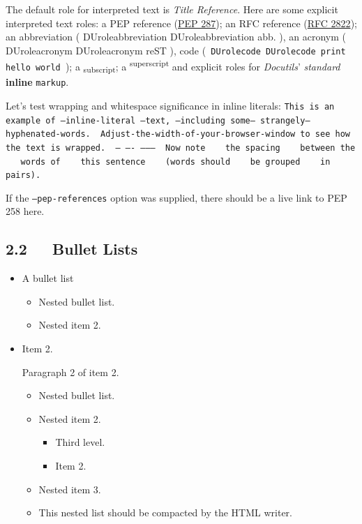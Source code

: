 \documentclass[a4paper]{article}
\providecommand*{\DUrole}[2]{%
  \ifcsname DUrole#1\endcsname%
    \csname DUrole#1\endcsname{#2}%
  \else%
    #2%
  \fi%
}
\providecommand*{\DUroletitlereference}[1]{\textsl{#1}}
\begin{document}
The default role for interpreted text is \DUroletitlereference{Title Reference}.  Here are
some explicit interpreted text roles: a PEP reference (\href{http://www.python.org/dev/peps/pep-0287}{PEP 287}); an
RFC reference (\href{http://tools.ietf.org/html/rfc2822.html}{RFC 2822}); an abbreviation (\DUrole{abbreviation}{abb.}), an acronym
(\DUrole{acronym}{reST}), code (\texttt{\DUrole{code}{print \textquotedbl{}hello world\textquotedbl{}}}); a \textsubscript{subscript};
a \textsuperscript{superscript} and explicit roles for \DUroletitlereference{Docutils}’
\emph{standard} \textbf{inline} \texttt{markup}.


Let’s test wrapping and whitespace significance in inline literals:
\texttt{This is an example of --inline-literal --text, --including some--
strangely--hyphenated-words. ~Adjust-the-width-of-your-browser-window
to see how the text is wrapped. ~-- ---- -------- ~Now note ~ ~the
spacing ~ ~between the ~ ~words of ~ ~this sentence ~ ~(words
should ~ ~be grouped ~ ~in pairs).}

If the \texttt{--pep-references} option was supplied, there should be a
live link to PEP 258 here.


\subsection{2.2   Bullet Lists%
  \label{bullet-lists}%
}

\begin{itemize}
\item A bullet list

\begin{itemize}
\item Nested bullet list.

\item Nested item 2.
\end{itemize}

\item Item 2.

Paragraph 2 of item 2.

\begin{itemize}
\item Nested bullet list.

\item Nested item 2.

\begin{itemize}
\item Third level.

\item Item 2.
\end{itemize}

\item Nested item 3.

\item This nested list should be compacted by the HTML writer.
%
\label{target}
\end{itemize}
\end{itemize}
\end{document}
